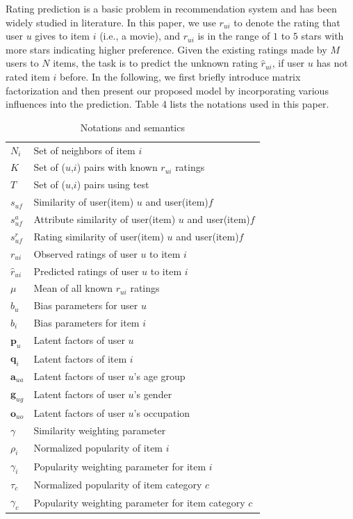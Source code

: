 \documentclass{llncs}
\begin{document}
    Rating prediction is a basic problem in recommendation system and  has been widely studied in literature.
    In this paper, we use $r_{ui}$ to denote the rating that user $u$ gives to item $i$ (i.e., a movie),  and
    $r_{ui}$ is in the range of $1$ to $5$ stars with more stars indicating higher preference.
    Given the existing ratings made by $M$ users to $N$ items, the task is to predict the unknown rating $\hat{r}_{ui}$,
    if user $u$ has not rated item $i$ before. In the following, we first briefly
	introduce matrix factorization and then present our proposed model
	by incorporating various influences into the prediction. Table 4 lists
	the notations used in this paper.
	\begin{table}
		\centering
		\caption{Notations and semantics}
		\begin{tabular}{l|l} \hline
			$N_i$&Set of neighbors of item $i$\\
			$K$ & Set of ($u$,$i$) pairs with known $r_{ui}$ ratings\\
			$T$ & Set of ($u$,$i$) pairs using test\\\hline
			$s_{uf}$ & Similarity of user(item) $u$ and user(item)$f$ \\
			$s^a_{uf}$ & Attribute similarity of user(item) $u$ and user(item)$f$ \\
			$s^r_{uf}$ & Rating similarity of user(item) $u$ and user(item)$f$ \\
			$r_{ui}$ & Observed ratings of user $u$ to item $i$\\
			$\hat{r}_{ui}$ & Predicted ratings of user $u$ to item $i$\\
			$\mu$& Mean of all known $r_{ui}$ ratings \\
			$b_u$ & Bias parameters for user $u$  \\
			$b_i$ & Bias parameters for item $i$ \\ \hline
			$\mathbf{p}_u$& Latent factors of user $u$\\
			$\mathbf{q}_i$& Latent factors of item $i$\\
			$\mathbf{a}_{ua}$& Latent factors of user $u$'s age group\\
			$\mathbf{g}_{ug}$& Latent factors of user $u$'s gender \\
			$\mathbf{o}_{uo}$& Latent factors of user $u$'s occupation \\\hline
			$\gamma$ &Similarity weighting parameter \\
			$\rho_i$ & Normalized popularity of item $i$ \\
			$\gamma_i$ &Popularity weighting parameter for item $i$\\
			$\tau_c$ & Normalized popularity of item category $c$\\
			$\gamma_c$ & Popularity weighting parameter for item category $c$\\ \hline
		\end{tabular}
	\end{table}
\end{document}

